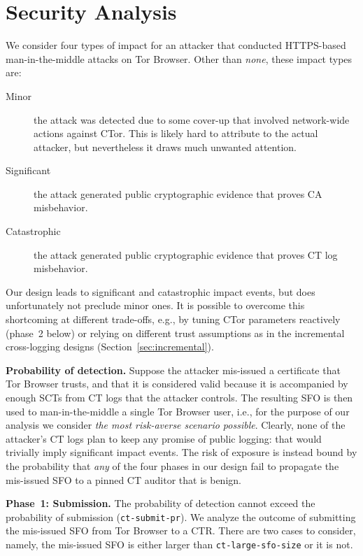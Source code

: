\section{Security Analysis} \label{sec:analysis}
We consider four types of impact for an attacker that conducted
HTTPS-based man-in-the-middle attacks on Tor Browser.  Other than \emph{none},
these impact types are:
\begin{description}
	\item[Minor] the attack was detected due to some cover-up that involved
		network-wide actions against CTor.  This is likely hard to attribute to
		the actual attacker, but nevertheless it draws much unwanted attention.
	\item[Significant] the attack generated public cryptographic evidence
		that proves CA misbehavior.
	\item[Catastrophic] the attack generated public cryptographic evidence
		that proves CT log misbehavior.
\end{description}

Our design leads to significant and catastrophic impact events, but does
unfortunately not preclude minor ones.  It is possible to overcome this
shortcoming at different trade-offs, e.g., by tuning CTor parameters reactively
(phase~2 below) or relying on different trust assumptions as in the
incremental cross-logging designs (Section~\ref{sec:incremental}).

\textbf{Probability of detection.}
Suppose the attacker mis-issued a certificate that Tor Browser trusts, and that
it is considered valid because it is accompanied by enough SCTs from CT logs
that the attacker controls.  The resulting SFO is then used to man-in-the-middle
a single Tor Browser user, i.e., for the purpose of our analysis we consider
\emph{the most risk-averse scenario possible}.  Clearly, none of the attacker's
CT logs plan to keep any promise of public logging:
	that would trivially imply significant impact events.
The risk of exposure is instead bound by the probability that \emph{any} of the
four phases in our design fail to propagate the mis-issued SFO to a pinned CT
auditor that is benign.

\textbf{Phase~1: Submission.}
The probability of detection cannot exceed the probability of submission
(\texttt{ct-submit-pr}). We analyze the outcome of submitting the mis-issued
SFO from Tor Browser to a CTR\@.  There are two cases to consider, namely, the
mis-issued SFO is either larger than \texttt{ct-large-sfo-size} or it is not.

